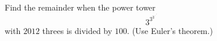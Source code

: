 Find the remainder when the power tower
\[3^{3^{3^{\cdot^{\cdot^{\cdot^{3}}}}}}\]
with $2012$ threes is divided by $100$. (Use Euler's theorem.)
